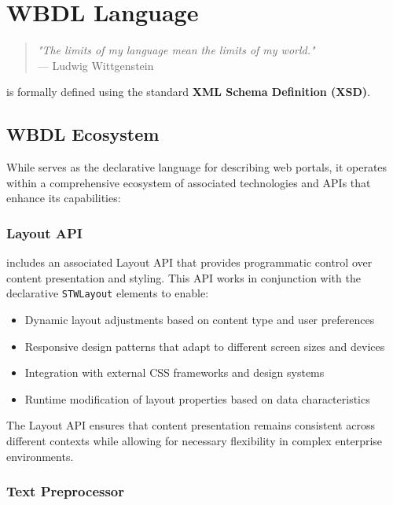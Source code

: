 
\chapter{WBDL Language}
\label{chap:wbdl}

\begin{quote}
\textit{"The limits of my language mean the limits of my world."} \\
— Ludwig Wittgenstein
\end{quote}

\wbdl{} is formally defined using the standard \textbf{XML Schema Definition (XSD)}.

\section{WBDL Ecosystem}
\label{sec:wbdl-ecosystem}

While \wbdl{} serves as the declarative language for describing web portals, it operates within a comprehensive ecosystem of associated technologies and APIs that enhance its capabilities:

\subsection{Layout API}
\label{sec:layout-api}

\wbdl{} includes an associated Layout API that provides programmatic control over content presentation and styling. This API works in conjunction with the declarative \texttt{STWLayout} elements to enable:

\begin{itemize}
\item Dynamic layout adjustments based on content type and user preferences
\item Responsive design patterns that adapt to different screen sizes and devices
\item Integration with external CSS frameworks and design systems
\item Runtime modification of layout properties based on data characteristics
\end{itemize}

The Layout API ensures that content presentation remains consistent across different contexts while allowing for necessary flexibility in complex enterprise environments.

\subsection{Text Preprocessor}
\label{sec:text-preprocessor}

